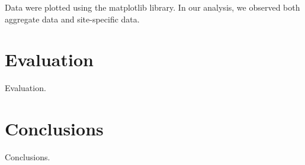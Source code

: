 \documentclass[twocolumn, 10pt, conference]{IEEEtran}
\begin{document}
Data were plotted using the matplotlib library. In our analysis, we observed both aggregate data and site-specific data.

\section{Evaluation}
\label{sec:evaluation}


Evaluation.

\section{Conclusions}
\label{sec:conclusions}



Conclusions.






\end{document}
